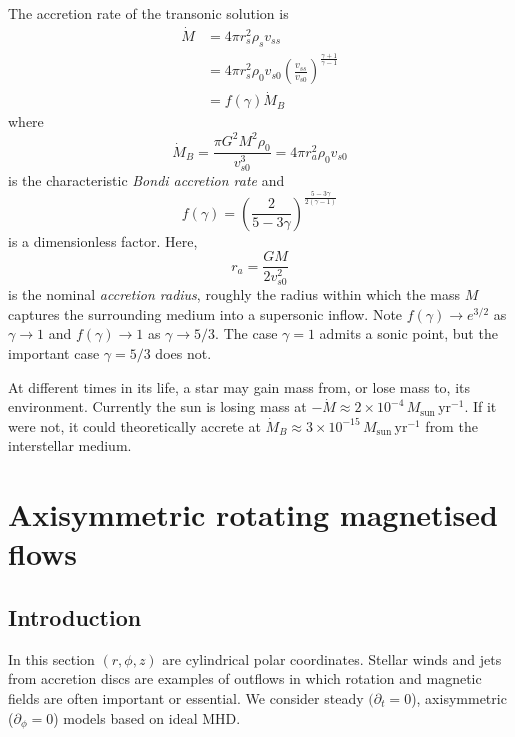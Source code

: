 \documentclass{jknotes}
\begin{document}
The accretion rate of the transonic solution is
\begin{align}
	\dot{M} &= 4\pi r_s^2 \rho_s v_{ss} \\
			&= 4\pi r_s^2 \rho_0 v_{s0}
			\left(\frac{v_{ss}}{v_{s0}}\right)^{\frac{\gamma+1}{\gamma-1}} \\
			&= f(\gamma) \dot{M}_B
\end{align}
where
\begin{equation}
	\dot{M}_B = \frac{\pi G^2 M^2 \rho_0}{v_{s0}^3} = 4\pi r_a^2 \rho_0 v_{s0}
\end{equation}
is the characteristic \emph{Bondi accretion rate} and
\begin{equation}
	f(\gamma) = \left(
	\frac{2}{5-3\gamma}\right)^{\frac{5-3\gamma}{2(\gamma-1)}}
\end{equation}
is a dimensionless factor. Here,
\begin{equation}
	r_a = \frac{GM}{2v_{s0}^2}
\end{equation}
is the nominal \emph{accretion radius}, roughly the radius within which the
mass $M$ captures the surrounding medium into a supersonic inflow. Note
$f(\gamma) \to e^{3/2}$ as $\gamma \to 1$ and $f(\gamma) \to 1$ as $\gamma \to
5/3$. The case $\gamma =1$ admits a sonic point, but the important case
$\gamma = 5/3$ does not.

At different times in its life, a star may gain mass from, or lose mass to,
its environment. Currently the sun is losing mass at $-\dot{M} \approx 2
\times 10^{-4} \,M_{\text{sun}} \,\text{yr}^{-1}$. If it were not, it could
theoretically accrete at $\dot{M}_B \approx 3 \times 10^{-15}\, M_{\text{sun}}
\,\text{yr}^{-1}$ from the interstellar medium.

\section{Axisymmetric rotating magnetised flows}
\subsection{Introduction}
In this section $(r, \phi, z)$ are cylindrical polar coordinates. Stellar
winds and jets from accretion discs are examples of outflows in which rotation
and magnetic fields are often important or essential. We consider steady
$(\partial_t = 0$), axisymmetric ($\partial_\phi = 0$) models based on ideal
MHD.
\end{document}

